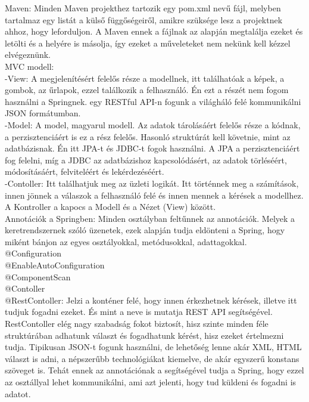\documentclass[11pt]{article}
\begin{document}
Maven: Minden Maven projekthez tartozik egy pom.xml nevű fájl, melyben tartalmaz egy listát a külső függőségeiről, amikre szüksége lesz a projektnek ahhoz, hogy leforduljon. A Maven ennek a fájlnak az alapján megtalálja ezeket és letölti és a helyére is másolja, így ezeket a műveleteket nem nekünk kell kézzel elvégeznünk.\\

MVC modell:\\

-View: A megjelenítésért felelős része a modellnek, itt találhatóak a képek, a gombok, az űrlapok, ezzel találkozik a felhasználó. Én ezt a részét nem fogom használni a Springnek. egy RESTful API-n fogunk a világháló felé kommunikálni JSON formátumban.\\

-Model: A model, magyarul modell. Az adatok tárolásáért felelős része a kódnak, a perzisztenciáért is ez a rész felelős. Hasonló struktúrát kell követnie, mint az adatbázisnak. Én itt JPA-t és JDBC-t fogok használni. A JPA a perzisztenciáért fog felelni, míg a JDBC az adatbázishoz kapcsolódásért, az adatok törléséért, módosításáért, felviteléért és lekérdezéséért.\\

-Contoller: Itt találhatjuk meg az üzleti logikát. Itt történnek meg a számítások, innen jönnek a válaszok a felhasználó felé és innen mennek a kérések a modellhez. A Kontroller a kapocs a Modell és a Nézet (View) között.\\

Annotációk a Springben: Minden osztályban feltűnnek az annotációk. Melyek a keretrendszernek szóló üzenetek, ezek alapján tudja eldönteni a Spring, hogy miként bánjon az egyes osztályokkal, metódusokkal, adattagokkal.\\

@Configuration\\
@EnableAutoConfiguration\\
@ComponentScan\\
@Contoller\\

@RestContoller: Jelzi a konténer felé, hogy innen érkezhetnek kérések, illetve itt tudjuk fogadni ezeket. És mint a neve is mutatja REST API segítségével. RestContoller elég nagy szabadság fokot biztosít, hisz szinte minden féle struktúrában adhatunk választ és fogadhatunk kérést, hisz ezeket értelmezni tudja. Tipikusan JSON-t fogunk használni, de lehetőség lenne akár XML, HTML választ is adni, a népszerűbb technológiákat kiemelve, de akár egyszerű konstans szöveget is. Tehát ennek az annotációnak a segítségével tudja a Spring, hogy ezzel az osztállyal lehet kommunikálni, ami azt jelenti, hogy tud küldeni és fogadni is adatot.\\
\end{document}
